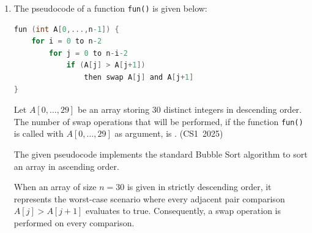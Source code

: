 \begin{enumerate}[label=\thesubsection.\arabic*, ref=\thesubsection.\theenumi]
\vspace{0.2cm}
\solution
Let $F$ be the event that the chosen coin is the fake coin, and $R$ be the event that it is a regular coin. 
The prior probabilities of selecting each coin are $P(F) = \frac{1}{5}$ and $P(R) = \frac{4}{5}$.
Let $H_2$ be the event of getting two heads when tossing the chosen coin twice.

The probability of getting two heads given a regular coin is:
\begin{align}
P(H_2 \mid R) = (0.5)^2 = 0.25
\end{align}

The probability of getting two heads given a fake coin is:
\begin{align}
P(H_2 \mid F) = (1.0)^2 = 1.0
\end{align}

Using Bayes' theorem:
\begin{align}
P(F \mid H_2) &= \frac{P(F) P(H_2 \mid F)}{P(F) P(H_2 \mid F) + P(R) P(H_2 \mid R)} \\
              &= \frac{\frac{1}{5} \times 1.0}{\left(\frac{1}{5} \times 1.0\right) + \left(\frac{4}{5} \times 0.25\right)} \\
              &= \frac{0.2}{0.2 + 0.2} \\
              &= 0.50
\end{align}

Therefore, the probability that the chosen coin is the fake coin is $0.50$.

\vspace{0.5cm}
\item The pseudocode of a function \texttt{fun()} is given below:
\begin{lstlisting}[language=C]
fun (int A[0,...,n-1]) {
    for i = 0 to n-2
        for j = 0 to n-i-2
            if (A[j] > A[j+1])
                then swap A[j] and A[j+1]
}
\end{lstlisting}
Let $A[0,\dots,29]$ be an array storing 30 distinct integers in descending order. The number of swap operations that will be performed, if the function \texttt{fun()} is called with $A[0,\dots,29]$ as argument, is \underline{\hspace{1cm}}.
\hfill (CS1~2025)

\vspace{0.2cm}
\solution
The given pseudocode implements the standard Bubble Sort algorithm to sort an array in ascending order.

When an array of size $n = 30$ is given in strictly descending order, it represents the worst-case scenario where every adjacent pair comparison $A[j] > A[j+1]$ evaluates to true. Consequently, a swap operation is performed on every comparison.


\end{enumerate}
